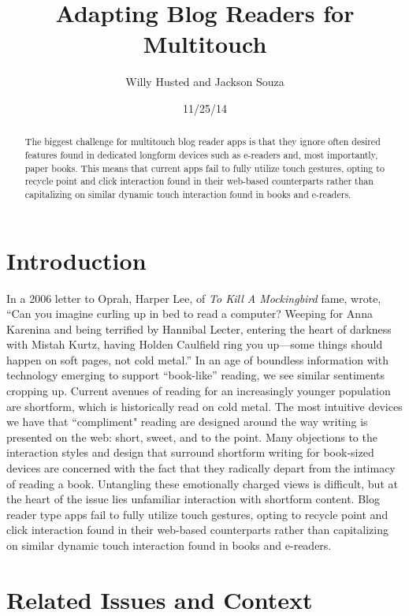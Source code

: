 \documentclass[11pt, oneside]{article}   	%
\title{Adapting Blog Readers for Multitouch}
\author{Willy Husted and Jackson Souza}
\date{11/25/14}							%
\begin{document}
\maketitle

\begin{abstract} %
The biggest challenge for multitouch blog reader apps is that they ignore often desired features found in dedicated longform devices such as e-readers and, most importantly, paper books. This means that current apps fail to fully utilize touch gestures, opting to recycle point and click interaction found in their web-based counterparts rather than capitalizing on similar dynamic touch interaction found in books and e-readers.
\end{abstract}

\section{Introduction}
In a 2006 letter to Oprah, Harper Lee, of \textit{To Kill A Mockingbird} fame, wrote, ``Can you imagine curling up in bed to read a computer? Weeping for Anna Karenina and being terrified by Hannibal Lecter, entering the heart of darkness with Mistah Kurtz, having Holden Caulfield ring you up---some things should happen on soft pages, not cold metal.'' \cite{Lee} In an age of boundless information with technology emerging to support ``book-like'' reading, we see similar sentiments cropping up. Current avenues of reading for an increasingly younger population are shortform, which is historically read on cold metal. The most intuitive devices we have that ``compliment" reading are designed around the way writing is presented on the web: short, sweet, and to the point. Many objections to the interaction styles and design that surround shortform writing for book-sized devices are concerned with the fact that they radically depart from the intimacy of reading a book. Untangling these emotionally charged views is difficult, but at the heart of the issue lies unfamiliar interaction with shortform content. Blog reader type apps fail to fully utilize touch gestures, opting to recycle point and click interaction found in their web-based counterparts rather than capitalizing on similar dynamic touch interaction found in books and e-readers. 


\section{Related Issues and Context}
\end{document}
